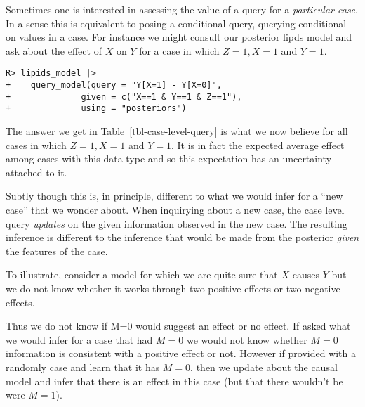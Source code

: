 \documentclass[
  11pt,
  article]{jss}
\begin{document}
Sometimes one is interested in assessing the value of a query for a
\emph{particular case}. In a sense this is equivalent to posing a
conditional query, querying conditional on values in a case. For
instance we might consult our posterior lipds model and ask about the
effect of \(X\) on \(Y\) for a case in which \(Z=1, X=1\) and \(Y=1\).

\begin{verbatim}
R> lipids_model |>
+    query_model(query = "Y[X=1] - Y[X=0]",
+              given = c("X==1 & Y==1 & Z==1"),
+              using = "posteriors")
\end{verbatim}

\hypertarget{tbl-case-level-query}{}
\begin{table}[!h]
\caption{\label{tbl-case-level-query}Case Level Quiry Example. }\tabularnewline

\centering
{}
\end{table}

The answer we get in Table~\ref{tbl-case-level-query} is what we now
believe for all cases in which \(Z=1, X=1\) and \(Y=1\). It is in fact
the expected average effect among cases with this data type and so this
expectation has an uncertainty attached to it.

Subtly though this is, in principle, different to what we would infer
for a ``new case'' that we wonder about. When inquirying about a new
case, the case level query \emph{updates} on the given information
observed in the new case. The resulting inference is different to the
inference that would be made from the posterior \emph{given} the
features of the case.

To illustrate, consider a model for which we are quite sure that \(X\)
causes \(Y\) but we do not know whether it works through two positive
effects or two negative effects.

Thus we do not know if M=0 would suggest an effect or no effect. If
asked what we would infer for a case that had \(M=0\) we would not know
whether \(M=0\) information is consistent with a positive effect or not.
However if provided with a randomly case and learn that it has \(M=0\),
then we update about the causal model and infer that there is an effect
in this case (but that there wouldn't be were \(M=1\)).
\end{document}
